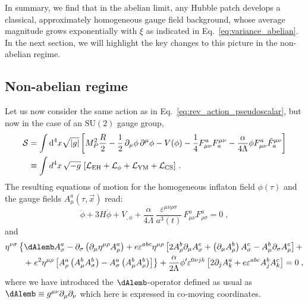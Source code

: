 In summary, we find that in the abelian limit, any Hubble patch develops a classical, approximately homogeneous gauge field background, whose average magnitude grows exponentially with $\xi$ as indicated in Eq.~\eqref{eq:variance_abelian}. In the next section, we will highlight the key changes to this picture in the non-abelian regime. 

\subsection{Non-abelian regime}

Let us now consider the same action as in Eq.~\eqref{eq:rev_action_pseudoscalar}, but now in the case of an $\mathrm{SU}(2)$ gauge group,
\begin{align}
\mathcal{S} & = \int \textrm{d}^4 x \sqrt{|g|} \left[M_P^2 \frac{R}{2} -\frac{1}{2} \, \partial_\mu \phi \, \partial^\mu \phi - V(\phi) - \frac{1}{4} F^a_{\mu \nu} F_a^{\mu \nu} - \frac{\alpha}{4 \Lambda} \phi F^a_{\mu \nu} \tilde F_a^{\mu \nu} \right ] \nonumber \\
& \equiv \int d^4 x \, \sqrt{-g} \, \left[\mathcal{L}_{\rm EH} + \mathcal{L}_{\phi} + \mathcal{L}_{\rm YM} + \mathcal{L}_{\rm CS}\right] \,. \label{eq:action}
\end{align}
The resulting equations of motion for the homogeneous inflaton field $\phi(\tau)$ and the gauge fields $A^a_\mu(\tau,\vec x)$ read:
\begin{equation}
	\ddot{\phi} + 3H \dot{\phi} + V_{,\phi} + \frac{\alpha}{4 \Lambda} \, \frac{\varepsilon^{\mu \nu \rho \sigma} }{ a^3(t)} \, F^a_{\mu\nu} F^a_{\rho\sigma} = 0 \;,
	\label{eq:phib}
\end{equation}
and
\begin{equation}
\begin{aligned}
\label{eq:eq_motion_final}
	\eta^{\nu\sigma} \left\{\dAlemb A_\sigma^a - \partial_\sigma \left(\partial_\mu \eta^{\mu\rho} A_\rho^a \right)+ e \varepsilon^{a b c} \eta^{\mu\rho} \left[ 2A_\rho^b \partial_\mu A_\sigma^c + \left( \partial_\mu A_\rho^b\right) A_\sigma^c - A_\mu^b \partial_\sigma A_\rho^c \right] + \right. \\
	+ \left. e^2 \eta^{\mu\rho} \left[ A_\rho^a \left( A_\mu^b A_\sigma^b \right) - A_\sigma^a \left( A_\mu^b A_\rho^b \right) \right] \right\} + \frac{\alpha}{2 \Lambda} \phi^\prime \varepsilon^{0 \nu j k} \left[2 \partial_j A^a_k + e \varepsilon^{abc} A^b_j A^c_k\right] = 0 \; ,
	\end{aligned}
\end{equation}
where we have introduced the $\dAlemb$-operator defined as usual as $\dAlemb \equiv g^{\mu\nu} \partial_{\mu} \partial_{\nu}$ which here is expressed in co-moving coordinates.

